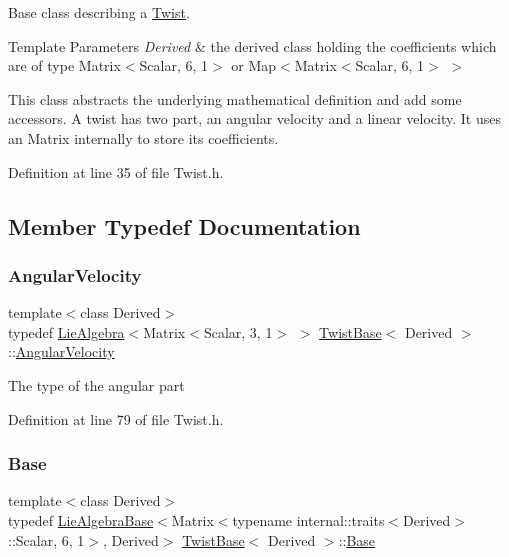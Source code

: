 Base class describing a \hyperlink{class_twist}{Twist}. 


\begin{DoxyTemplParams}{Template Parameters}
{\em Derived} & the derived class holding the coefficients which are of type Matrix$<$\+Scalar, 6, 1$>$ or Map$<$Matrix$<$\+Scalar, 6, 1$>$ $>$\\
\hline
\end{DoxyTemplParams}
This class abstracts the underlying mathematical definition and add some accessors. A twist has two part, an angular velocity and a linear velocity. It uses an Matrix internally to store its coefficients. 

Definition at line 35 of file Twist.\+h.



\subsection{Member Typedef Documentation}
\hypertarget{class_twist_base_ad0bc13debe8afc170da877cebe4dc45f}{}\label{class_twist_base_ad0bc13debe8afc170da877cebe4dc45f} 
\subsubsection{\texorpdfstring{Angular\+Velocity}{AngularVelocity}}
{\footnotesize\ttfamily template$<$class Derived$>$ \\
typedef \hyperlink{class_lie_algebra}{Lie\+Algebra}$<$Matrix$<$Scalar, 3, 1$>$ $>$ \hyperlink{class_twist_base}{Twist\+Base}$<$ Derived $>$\+::\hyperlink{class_twist_base_ad0bc13debe8afc170da877cebe4dc45f}{Angular\+Velocity}}

The type of the angular part 

Definition at line 79 of file Twist.\+h.

\hypertarget{class_twist_base_a5855f503803bbb643e270d0cc7360c1f}{}\label{class_twist_base_a5855f503803bbb643e270d0cc7360c1f} 
\subsubsection{\texorpdfstring{Base}{Base}}
{\footnotesize\ttfamily template$<$class Derived$>$ \\
typedef \hyperlink{class_lie_algebra_base}{Lie\+Algebra\+Base}$<$Matrix$<$typename internal\+::traits$<$Derived$>$\+::Scalar, 6, 1$>$, Derived$>$ \hyperlink{class_twist_base}{Twist\+Base}$<$ Derived $>$\+::\hyperlink{class_twist_base_a5855f503803bbb643e270d0cc7360c1f}{Base}\hspace{0.3cm}{\ttfamily [protected]}}

